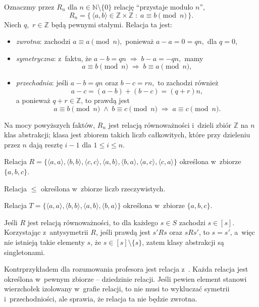 \exercise %
Oznaczmy przez $R_n$ dla $n\in\mathbb{N}\setminus\{0\}$ relację ``przystaje modulo $n$'',
\[
	R_n = \bigl\{\,\langle a,b\rangle\in\mathbb{Z}\times\mathbb{Z}\;:\;a\equiv b\!\!\!\pmod{n}\,\bigr\}.
\]
Niech $q$,~$r\in\mathbb{Z}$ będą pewnymi stałymi. Relacja ta jest:
\begin{itemize}
	\item \emph{zwrotna}: zachodzi $a\equiv a\pmod{n},$ ponieważ $a-a=0=qn,$ dla $q=0$,
	\item \emph{symetryczna}: z~faktu, że $a-b=qn\;\Rightarrow\;b-a=-qn,$ mamy
	\[
		a\equiv b\!\!\!\pmod{n}\;\Rightarrow\;b\equiv a\!\!\!\pmod{n},
	\]
	\item \emph{przechodnia}: jeśli $a-b=qn$ oraz $b-c=rn,$ to zachodzi również
	\[
		a-c=(a-b)+(b-c)=(q+r)n,
	\]
	a ponieważ $q+r\in\mathbb{Z}$, to prawdą jest
	\[
		a\equiv b\!\!\!\pmod{n}\;\wedge\;b\equiv c\!\!\!\pmod{n}\;\Rightarrow\;a\equiv c\!\!\!\pmod{n}.
	\]
\end{itemize}

Na mocy powyższych faktów, $R_n$ jest relacją równoważności i~dzieli zbiór $\mathbb{Z}$ na $n$ klas abstrakcji;  klasa jest zbiorem takich liczb całkowitych, które przy dzieleniu przez $n$ dają resztę $i-1$ dla $1\le i\le n$.

\exercise %
\subexercise
Relacja $R=\bigl\{\langle a,a\rangle,\langle b,b\rangle,\langle c,c\rangle,\langle a,b\rangle,\langle b,a\rangle,\langle a,c\rangle,\langle c,a\rangle\bigr\}$ określona w~zbiorze $\{a,b,c\}$.

\subexercise
Relacja $\le$ określona w~zbiorze liczb rzeczywistych.

\subexercise
Relacja $T=\bigl\{\langle a,a\rangle,\langle b,b\rangle,\langle a,b\rangle,\langle b,a\rangle\bigr\}$ określona w~zbiorze $\{a,b,c\}$.

\exercise %
Jeśli $R$ jest relacją równoważności, to dla każdego $s\in S$ zachodzi $s\in[s]$. Korzystając z~antysymetrii $R$, jeśli prawdą jest $s'\!Rs$ oraz $sRs'$, to $s=s'$, a~więc nie istnieją takie elementy $s$, że $s\in[s]\setminus\{s\}$, zatem klasy abstrakcji są singletonami.

\exercise %
Kontrprzykładem dla rozumowania profesora jest relacja z~. Każda relacja jest określona w~pewnym zbiorze -- dziedzinie relacji. Jeśli pewien element stanowi wierzchołek izolowany w~grafie relacji, to nie musi to wykluczać symetrii i~przechodniości, ale sprawia, że relacja ta nie będzie zwrotna.


